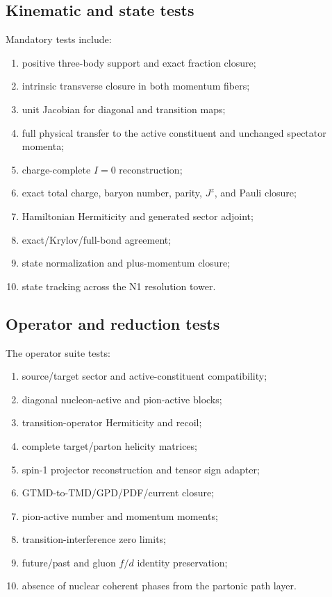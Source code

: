 \documentclass[11pt]{article}
\begin{document}
\subsection{Kinematic and state tests}

Mandatory tests include:
\begin{enumerate}
\item positive three-body support and exact fraction closure;
\item intrinsic transverse closure in both momentum fibers;
\item unit Jacobian for diagonal and transition maps;
\item full physical transfer to the active constituent and unchanged
spectator momenta;
\item charge-complete \(I=0\) reconstruction;
\item exact total charge, baryon number, parity, \(J^z\), and Pauli closure;
\item Hamiltonian Hermiticity and generated sector adjoint;
\item exact/Krylov/full-bond agreement;
\item state normalization and plus-momentum closure;
\item state tracking across the N1 resolution tower.
\end{enumerate}

\subsection{Operator and reduction tests}

The operator suite tests:
\begin{enumerate}
\item source/target sector and active-constituent compatibility;
\item diagonal nucleon-active and pion-active blocks;
\item transition-operator Hermiticity and recoil;
\item complete target/parton helicity matrices;
\item spin-1 projector reconstruction and tensor sign adapter;
\item GTMD-to-TMD/GPD/PDF/current closure;
\item pion-active number and momentum moments;
\item transition-interference zero limits;
\item future/past and gluon \(f/d\) identity preservation;
\item absence of nuclear coherent phases from the partonic path layer.
\end{enumerate}
\end{document}
